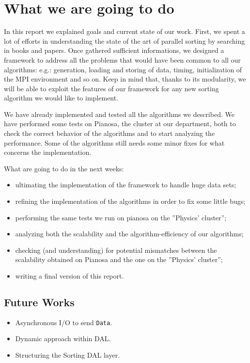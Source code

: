 \label{conclusion}
\section{What we are going to do}
In this report we explained goals and current state of our work. First, we spent a lot of efforts in understanding the state of the art of parallel sorting by searching in books and papers. Once gathered sufficient informations, we designed a framework to address all the problems that would have been common to all our algorithms: e.g.: generation, loading and storing of data, timing, initialization of the MPI environment and so on. Keep in mind that, thanks to its modularity, we will be able to exploit the features of our framework for any new sorting algorithm we would like to implement. 

We have already implemented and tested all the algorithms we described. We have performed some tests on Pianosa, the cluster at our department, both to check the correct behavior of the algorithms and to start analyzing the performance. Some of the algorithms still needs some minor fixes for what concerns the implementation.

What are going to do in the next weeks:
\begin{itemize}
\item ultimating the implementation of the framework to handle huge data sets;
\item refining the implementation of the algorithms in order to fix some little bugs;
\item performing the same tests we run on pianosa on the ''Physics' cluster'';
\item analyzing both the scalability and the algorithm-efficiency of our algorithms;
\item checking (and understanding) for potential mismatches between the scalability obtained on Pianosa and the one on the ''Physics' cluster'';
\item writing a final version of this report.
\end{itemize}

\subsection{Future Works}
\begin{itemize}
\item Asynchronous I/O to send \texttt{Data}. 
\item Dynamic approach within DAL.
\item Structuring the Sorting DAL layer.
\end{itemize}